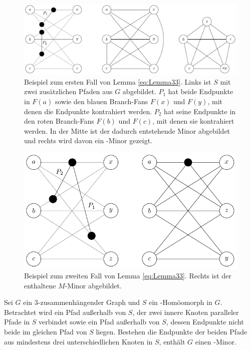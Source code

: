 \begin{figure}[H]
  \centering
  \includegraphics[keepaspectratio]{bilder/Lemma331.pdf}
  \caption{Beispiel zum ersten Fall von Lemma \ref{eq:Lemma33}.
           Links ist $S$ mit zwei zusätzlichen Pfaden aus $G$ abgebildet.
           $P_1$ hat beide Endpunkte in $F(a)$ sowie den blauen Branch-Fans $F(x)$ und $F(y)$, mit denen die Endpunkte kontrahiert werden.
           $P_2$ hat seine Endpunkte in den roten Branch-Fans $F(b)$ und $F(c)$, mit denen sie kontrahiert werden.
           In der Mitte ist der dadurch entstehende Minor abgebildet und rechts wird davon ein \kf-Minor gezeigt.}
  \label{fig:Lemma331}
\end{figure}
\begin{figure}[H]
  \centering
  \includegraphics[keepaspectratio]{bilder/Lemma332.pdf}
  \caption{Beispiel zum zweiten Fall von Lemma \ref{eq:Lemma33}.
           Rechts ist der enthaltene $M$-Minor abgebildet.}
  \label{fig:Lemma332}
\end{figure}

\begin{lemma}\label{eq:Lemma34}
  Sei $G$ ein $3$-zusammenhängender Graph und $S$ ein \kdd-Homöomorph in $G$.
  Betrachtet wird ein Pfad außerhalb von $S$, der zwei innere Knoten paralleler Pfade in $S$ verbindet sowie ein Pfad außerhalb von $S$, dessen Endpunkte nicht beide im gleichen Pfad von $S$ liegen.
  Bestehen die Endpunkte der beiden Pfade aus mindestens drei unterschiedlichen Knoten in $S$, enthält $G$ einen \kf-Minor.
\end{lemma}

